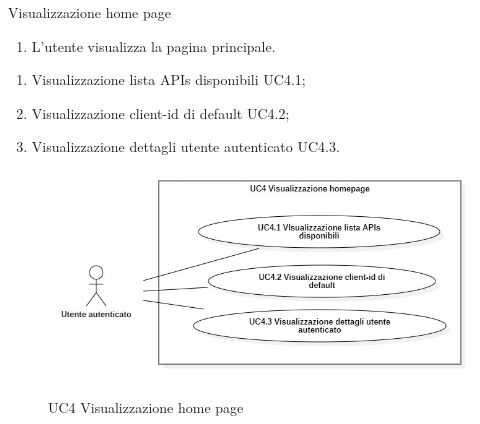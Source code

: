 \begin{usecase}{4}{Visualizzazione home page}\label{uc:visualizzasioen-home-page}

    \usecasemain{}
        \begin{enumerate}
            \item L'utente visualizza la pagina principale.
        \end{enumerate}

        \begin{enumerate}
            \item Visualizzazione lista APIs disponibili UC4.1;
            \item Visualizzazione client-id di default UC4.2;
            \item Visualizzazione dettagli utente autenticato UC4.3.
        \end{enumerate}

\end{usecase}

\begin{figure}[!ht] 
    \centering 
    \includegraphics[width=\columnwidth, alt={Caso d'uso relativo alla visualizzazione della homepage}]{images/usecase/UC4.jpg}
    \caption{UC4 Visualizzazione home page}\label{fig:uc:visualizzazione-home-page}
  \end{figure}

\pagebreak

